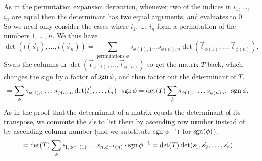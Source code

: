 \begin{exercises}
\begin{answer}
      As in the permutation expansion derivation,
      whenever two of the indices in $i_1$, \ldots, $i_n$ are equal 
      then the determinant
      has two equal arguments, and evaluates to $0$. 
      So we need only consider the cases where $i_1$, \ldots, $i_n$ form a
      permutation of the numbers $1$, \ldots, $n$.
      We thus have
      \begin{equation*}
        \det(t(\vec{s}_1),\dots,t(\vec{s}_n))=
          \sum_{\text{permutations\ } \phi}
            s_{\phi(1),1}\dots s_{\phi(n),n}
            \det(\vec{t}_{\phi(1)},\dots,\vec{t}_{\phi(n)}).
      \end{equation*}
      Swap the columns in $\det(\vec{t}_{\phi(1)},\ldots,\vec{t}_{\phi(n)})$
      to get the matrix \( T \) back, which changes the sign by a factor of 
      $\operatorname{sgn}{\phi}$,
      and then factor out the determinant of $T$.
      \begin{equation*}
        =\sum_\phi
          s_{\phi(1),1}\dots s_{\phi(n),n}
            \det(\vec{t}_1,\dots,\vec{t}_n)\cdot\operatorname{sgn}{\phi}
        =\det(T)\sum_\phi
          s_{\phi(1),1}\dots s_{\phi(n),n}\cdot\operatorname{sgn}{\phi}.
      \end{equation*}
      As in the proof that the determinant of a matrix 
      equals the determinant 
      of its transpose, we commute the $s$'s to list them by ascending
      row number instead of by ascending column number
      (and we substitute $\operatorname{sgn}(\phi^{-1})$ for $\operatorname{sgn}(\phi)$).
      \begin{equation*}
        =\det(T)\sum_\phi
          s_{1,\phi^{-1}(1)}\dots s_{n,\phi^{-1}(n)}\cdot\operatorname{sgn}{\phi^{-1}}  
        =\det(T)\det(\vec{s}_1,\vec{s}_2,\dots,\vec{s}_n)
      \end{equation*}
    \end{answer}

\end{exercises}
